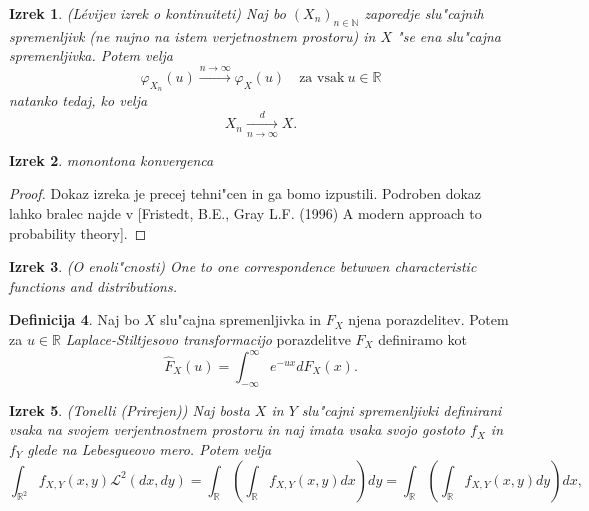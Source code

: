 \documentclass[12pt, a4paper, reqno]{amsart}
\theoremstyle{definition}
\newtheorem{definicija}{Definicija}[section]
\theoremstyle{plain}
\newtheorem{izrek}[definicija]{Izrek}
\newcommand{\R}{\mathbb{R}}
\newcommand{\N}{\mathbb{N}}
\newcommand{\1}{\mathds{1}}
\begin{document}
    \begin{izrek}(Lévijev izrek o kontinuiteti)
        Naj bo $(X_n)_{n\in\N}$ zaporedje slu"cajnih spremenljivk (ne nujno na istem verjetnostnem prostoru)
        in $X$ "se ena slu"cajna spremenljivka. Potem velja
        \begin{equation*}
            \varphi_{X_n}(u) \xrightarrow{n\to\infty} \varphi_X(u) \quad \text{za vsak} \ u \in \R
        \end{equation*}
        natanko tedaj, ko velja
        \begin{equation*}
            X_n \xrightarrow[n\to\infty]{d} X.
        \end{equation*}
        \label{izr:LevijevIzrek}
    \end{izrek}

    \begin{izrek}
        monontona konvergenca
        \label{izr:monotonaKonvergenca}
    \end{izrek}

    \begin{proof}
        Dokaz izreka je precej tehni"cen in ga bomo izpustili. Podroben dokaz lahko bralec najde v 
        [Fristedt, B.E., Gray L.F. (1996) A modern approach to probability theory].
    \end{proof}

    \begin{izrek}(O enoli"cnosti)
        One to one correspondence betwwen characteristic functions and distributions.
    \end{izrek}

    \begin{definicija}
        Naj bo $X$ slu"cajna spremenljivka in $F_X$ njena porazdelitev. Potem za $u\in\R$
         \textit{Laplace-Stiltjesovo transformacijo} porazdelitve $F_X$ definiramo kot
        \begin{equation*}
            \hat{F}_X(u) = \int_{-\infty}^{\infty}e^{-ux}dF_X(x).
        \end{equation*}
        \label{def:LaplaceStiltjesovaTransformacija}
    \end{definicija}

    \begin{izrek}(Tonelli (Prirejen))
        Naj bosta $X$ in $Y$ slu"cajni spremenljivki definirani vsaka na svojem verjentnostnem prostoru
        in naj imata vsaka svojo gostoto $f_X$ in $f_Y$ glede na Lebesgueovo mero.
        Potem velja
        \begin{equation*}
            \int_{\R^2}f_{X, Y}(x, y)\mathcal{L}^2(dx, dy) 
            = \int_{\R}\left(\int_{\R}f_{X, Y}(x, y)dx\right)dy = \int_{\R}\left(\int_{\R}f_{X, Y}(x, y)dy\right)dx,
        \end{equation*}
        \label{izr:TonellijevIzrek}
    \end{izrek}
\end{document}
